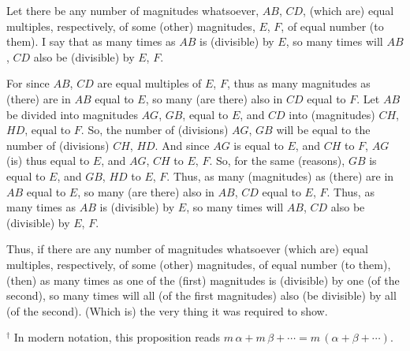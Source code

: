 \begin{Parallel}{}{}
{Let there be any number of magnitudes whatsoever, $AB$, $CD$, (which are) equal multiples,
respectively, of some (other) magnitudes, $E$, $F$,  of equal  number
(to them). I say that as many times as $AB$ is (divisible) by $E$, so many times will
$AB$, $CD$ also be (divisible) by $E$, $F$.

\epsfysize=0.6in
\centerline{}

For since $AB$, $CD$ are equal multiples of $E$, $F$, thus as many
magnitudes as (there) are in  $AB$ equal to $E$, so many (are there) also in $CD$ equal to $F$. Let $AB$ be divided into magnitudes $AG$, $GB$, equal to $E$,
and $CD$ into (magnitudes) $CH$, $HD$, equal to $F$. So, the number of (divisions)
$AG$, $GB$ will be equal to the number of (divisions) $CH$, $HD$. And since
$AG$ is equal to $E$, and $CH$ to $F$,   $AG$ (is)  thus equal to $E$, and $AG$, $CH$ to
$E$, $F$. So, for the same (reasons), $GB$ is equal to $E$, and $GB$, $HD$ to $E$, $F$.
Thus, as many (magnitudes) as (there) are in $AB$ equal to $E$, so many (are there)
also in $AB$, $CD$ equal to $E$, $F$. Thus, as many times as $AB$ is (divisible) by $E$, so many
times will $AB$, $CD$ also be (divisible)  by $E$, $F$.

Thus, if there are any number of magnitudes whatsoever (which are) equal multiples, respectively, of
some (other) magnitudes,  of  equal  number (to them), (then) as many times as one of the (first) magnitudes is (divisible) by one (of the second), so many times
will all (of the first magnitudes) also (be divisible) by all (of the second). (Which is)
the very thing it was required to show.}
\end{Parallel}
{\footnotesize \noindent$^\dag$ In modern notation, this proposition
reads $m\,\alpha + m\,\beta +\cdots= m\,(\alpha+\beta+\cdots)$.}

